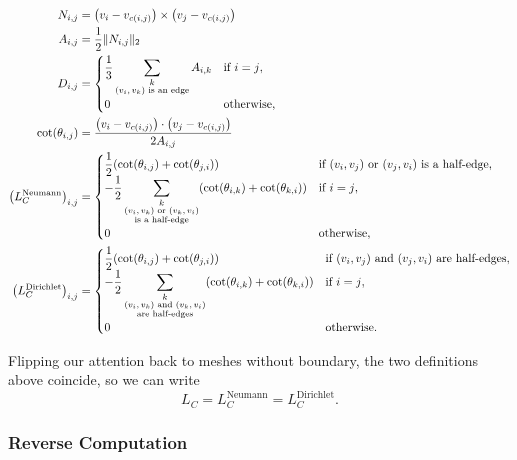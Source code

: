 \begin{align*}
	N_{i, j} &= \pof{v_i - v_{c\pof{i, j}}} \times \pof{v_j - v_{c\pof{i, j}}} \\
	A_{i, j} &= \frac{1}{2}\|N_{i, j}\|_2 \\
	D_{i, j} &= \begin{cases}
		\displaystyle\frac{1}{3}\sum_{\substack{k \\ \text{\(\pof{v_i, v_k}\) is an edge}}}A_{i, k} & \text{if \(i = j\)}, \\
		0 & \text{otherwise},
	\end{cases} \\
	\cot\pof{\theta_{i, j}} &= \frac{\pof{v_i - v_{c\pof{i, j}}} \cdot \pof{v_j - v_{c\pof{i, j}}}}{2A_{i, j}} \\
	\pof{L_C^{\text{Neumann}}}_{i, j} &= \begin{cases}
		\displaystyle\frac{1}{2}\pof{\cot\pof{\theta_{i, j}} + \cot\pof{\theta_{j, i}}} & \text{if \(\pof{v_i, v_j}\) or \(\pof{v_j, v_i}\) is a half-edge}, \\
		\displaystyle-\frac{1}{2}\sum_{\substack{k \\ \text{\(\pof{v_i, v_k}\) or \(\pof{v_k, v_i}\)} \\ \text{is a half-edge}}}\pof{\cot\pof{\theta_{i, k}} + \cot\pof{\theta_{k, i}}} & \text{if \(i = j\)}, \\
		0 & \text{otherwise},
	\end{cases} \\
	\pof{L_C^{\text{Dirichlet}}}_{i, j} &= \begin{cases}
		\displaystyle\frac{1}{2}\pof{\cot\pof{\theta_{i, j}} + \cot\pof{\theta_{j, i}}} & \text{if \(\pof{v_i, v_j}\) and \(\pof{v_j, v_i}\) are half-edges}, \\
		\displaystyle-\frac{1}{2}\sum_{\substack{k \\ \text{\(\pof{v_i, v_k}\) and \(\pof{v_k, v_i}\)} \\ \text{are half-edges}}}\pof{\cot\pof{\theta_{i, k}} + \cot\pof{\theta_{k, i}}} & \text{if \(i = j\)}, \\
		0 & \text{otherwise}.
	\end{cases}
\end{align*}

Flipping our attention back to meshes without boundary, the two definitions above coincide, so we can write \[L_C = L_C^{\text{Neumann}} = L_C^{\text{Dirichlet}}.\]

\subsubsection{Reverse Computation}

